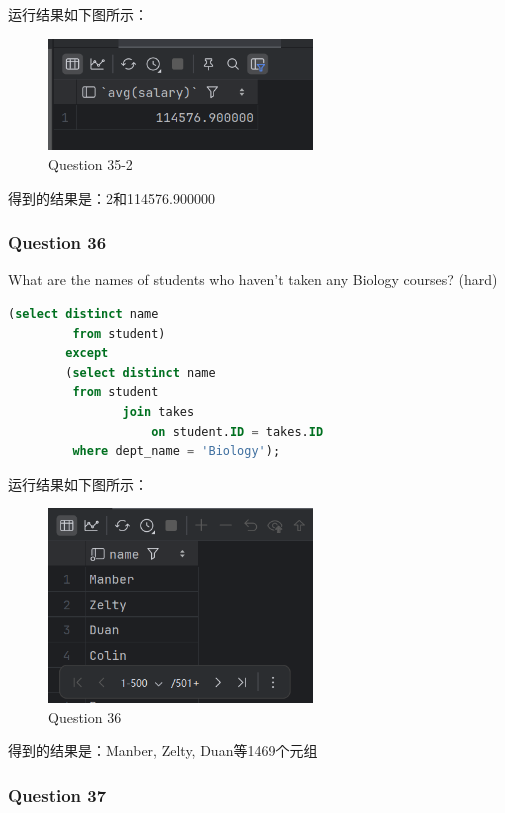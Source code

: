 \documentclass{article}
\begin{document}
    运行结果如下图所示：
    
    \begin{figure}[H]
    	\centering
    	\includegraphics[width=7cm]{./images/40.Question35-2.png}
    	\caption{Question 35-2}
    \end{figure}
    
    得到的结果是：2和114576.900000
    
    \subsubsection{Question 36}
    
    What are the names of students who haven't taken any Biology courses?  (hard)
    
    \begin{lstlisting}[language=sql, title=Question 36, tabsize=4]
    	(select distinct name
    	 from student)
    	except
    	(select distinct name
    	 from student
    			join takes
    				on student.ID = takes.ID
    	 where dept_name = 'Biology');
    \end{lstlisting}
    
    运行结果如下图所示：
    
    \begin{figure}[H]
    	\centering
    	\includegraphics[width=7cm]{./images/41.Question36.png}
    	\caption{Question 36}
    \end{figure}
    
    得到的结果是：Manber, Zelty, Duan等1469个元组
    
    \subsubsection{Question 37}
    
\end{document}

